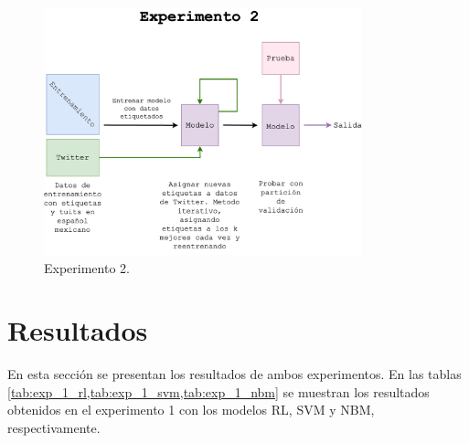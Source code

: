 \documentclass[a4paper]{llncs}
\begin{document}
\begin{figure}[htbp!]
\centering
\includegraphics[keepaspectratio,width=0.82\textwidth]{./img/comia_blue_exp2.png}
\caption{\label{fig:exp2}Experimento 2.}
\end{figure}
\clearpage


\section{Resultados}
\label{sec:org2db8ff9}
En esta sección se presentan los resultados de ambos experimentos. En las
tablas \ref{tab:exp_1_rl,tab:exp_1_svm,tab:exp_1_nbm} se muestran los resultados
obtenidos en el experimento 1 con los modelos RL, SVM y NBM, respectivamente.
\end{document}
